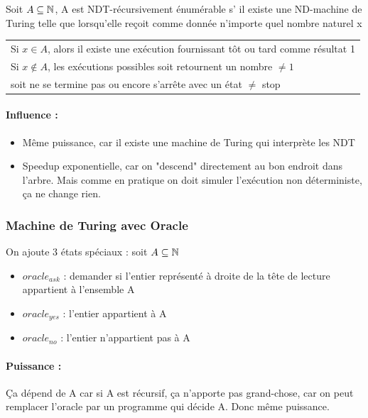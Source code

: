 \begin{mydef} Soit $A\subseteq \mathbb{N}$, A est 
	NDT-récursivement énumérable s’ il 
	existe une ND-machine de Turing telle que lorsqu'elle reçoit comme 
	donnée n'importe quel nombre naturel x\\
	\begin{tabular}{l}
		Si $x\in A$, alors il existe une exécution fournissant tôt ou 
		tard comme résultat 1\\
		Si $x\notin A$, les exécutions possibles soit retournent un 
		nombre $\neq 1$ \\
		soit ne se termine pas ou encore s'arrête avec 
		un état $\neq$ stop\\
	\end{tabular}
\end{mydef}

\paragraph{Influence :} 
\begin{itemize}
	\item Même puissance, car il existe une machine de Turing qui interprète
	 les NDT 
	\item Speedup exponentielle, car on "descend" directement au bon endroit 
		dans l'arbre. Mais comme en pratique on doit simuler 
		l'exécution non déterministe, ça ne change rien.
\end{itemize}

\subsubsection{Machine de Turing avec Oracle}
On ajoute 3 états spéciaux : soit $A \subseteq \mathbb{N}$
\begin{itemize}
	\item $oracle_{ask}$ : demander si l'entier représenté à droite de la 
		tête de lecture appartient à l'ensemble A
	\item $oracle_{yes}$ : l'entier appartient à A
	\item $oracle_{no}$ :  l'entier n'appartient pas à A
\end{itemize}

\paragraph{Puissance :} Ça dépend de A car si A est récursif, ça n'apporte pas 
grand-chose, car on peut remplacer l'oracle par un programme qui décide A. Donc 
même puissance. 

